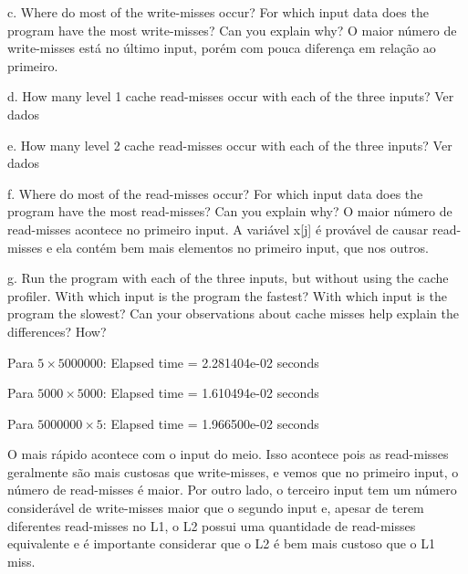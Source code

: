 c. Where do most of the write-misses occur? For which input data does the program have the most write-misses? Can you explain why? O maior número de write-misses está no último input, porém com pouca diferença em relação ao primeiro.

d. How many level 1 cache read-misses occur with each of the three inputs? Ver dados

e. How many level 2 cache read-misses occur with each of the three inputs? Ver dados

f. Where do most of the read-misses occur? For which input data does the program have the most read-misses? Can you explain why? O maior número de read-misses acontece no primeiro input. A variável x[j] é provável de causar read-misses e ela contém bem mais elementos no primeiro input, que nos outros.

g. Run the program with each of the three inputs, but without using the cache profiler. With which input is the program the fastest? With which input is the program the slowest? Can your observations about cache misses help explain the differences? How?

Para $5 \times 5000000$:
Elapsed time = 2.281404e-02 seconds

Para $5000 \times 5000$:
Elapsed time = 1.610494e-02 seconds

Para $5000000 \times 5$:
Elapsed time = 1.966500e-02 seconds

O mais rápido acontece com o input do meio. Isso acontece pois as read-misses geralmente são mais custosas que write-misses, e vemos que no primeiro input, o número de read-misses é maior. Por outro lado, o terceiro input tem um número considerável de write-misses maior que o segundo input e, apesar de terem diferentes read-misses no L1, o L2 possui uma quantidade de read-misses equivalente e é importante considerar que o L2 é bem mais custoso que o L1 miss.




